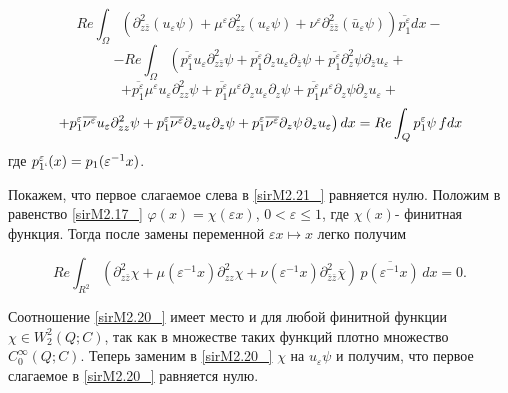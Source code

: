 \begin{equation*}
Re\int _{\Omega }\left(\partial _{z\bar{z}}^{2} (u_{\varepsilon } \psi )+\mu ^{\varepsilon } \partial _{zz}^{2} (u_{\varepsilon } \psi )+\nu ^{\varepsilon } \partial _{\bar{z}\bar{z}}^{2} (\bar{u}_{\varepsilon } \psi )\right) \overline{p_{1}^{\varepsilon } }dx-
\end{equation*}
\begin{equation*}
-Re\int _{\Omega }\left(\overline{p_{1}^{\varepsilon } }u_{\varepsilon } \partial _{z\bar{z}}^{2} \psi +\overline{p_{1}^{\varepsilon } }\partial _{z}^{} u_{\varepsilon } \partial _{\bar{z}} \psi +\overline{p_{1}^{\varepsilon } }\partial _{z}^{2} \psi \partial _{\bar{z}} u_{\varepsilon } \right.  +
\end{equation*}
\begin{equation*}
+\overline{p_{1}^{\varepsilon } }\mu ^{\varepsilon } u_{\varepsilon } \partial _{zz}^{2} \psi +\overline{p_{1}^{\varepsilon } }\mu ^{\varepsilon } \partial _{z} u_{\varepsilon } \partial _{z} \psi +\overline{p_{1}^{\varepsilon } }\mu ^{\varepsilon } \partial _{z} \psi \partial _{z} u_{\varepsilon } +
\end{equation*}
\begin{equation}
\label{sirM2.21_}
\left. +p_{1}^{\varepsilon } \overline{\nu ^{\varepsilon } }u_{\varepsilon } \partial _{zz}^{2} \psi +p_{1}^{\varepsilon } \overline{\nu ^{\varepsilon } }\partial _{z} u_{\varepsilon } \partial _{z} \psi +p_{1}^{\varepsilon } \overline{\nu ^{\varepsilon } }\partial _{z} \psi {\kern 1pt} \partial _{z} u_{\varepsilon } \right)dx=Re\int _{Q}p_{1}^{\varepsilon } \psi \, f dx
\end{equation}
где $p_{1`}^{\varepsilon } (x)=p_{1} (\varepsilon ^{-1} x)$.

Покажем, что первое слагаемое слева в \eqref{sirM2.21_} равняется нулю. Положим в равенство \eqref{sirM2.17_} $\varphi (x)=\chi (\varepsilon x)$, $0<\varepsilon \le 1$, где $\chi (x)$- финитная функция. Тогда после замены переменной $\varepsilon x\mapsto x$ легко получим

\begin{equation}
\label{sirM2.22_}
Re\int _{R^{2} }\left(\partial _{z\bar{z}}^{2} \chi +\mu (\varepsilon ^{-1} x)\partial _{zz}^{2} \chi +\nu (\varepsilon ^{-1} x)\partial _{\bar{z}\bar{z}}^{2} \bar{\chi }\right) \, \overline{p(\varepsilon ^{-1} x)}\, dx=0.
\end{equation}

Соотношение \eqref{sirM2.20_} имеет место и для любой финитной функции $\chi \in W_{2}^{2} (Q;C)$, так как в множестве таких функций плотно множество $C_{0}^{\infty } (Q;C)$. Теперь заменим в \eqref{sirM2.20_} $\chi $ на $u_{\varepsilon } \psi $ и получим, что первое слагаемое в \eqref{sirM2.20_} равняется нулю.

